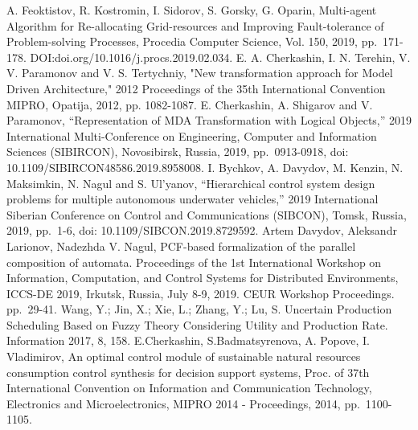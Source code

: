 \documentclass[runningheads]{llncs}
\begin{document}
\begin{thebibliography}{999}
    \makeatletter
    \def\@biblabel#1{[#1]}
    \makeatother
     A. Feoktistov, R. Kostromin, I. Sidorov, S. Gorsky, G. Oparin, Multi-agent Algorithm for Re-allocating Grid-resources and Improving Fault-tolerance of Problem-solving Processes, Procedia Computer Science, Vol. 150, 2019, pp. 171-178. DOI:doi.org/10.1016/j.procs.2019.02.034.
     E. A. Cherkashin, I. N. Terehin, V. V. Paramonov and V. S. Tertychniy, "New transformation approach for Model Driven Architecture," 2012 Proceedings of the 35th International Convention MIPRO, Opatija, 2012, pp. 1082-1087.
     E. Cherkashin, A. Shigarov and V. Paramonov, “Representation of MDA Transformation with Logical Objects,” 2019 International Multi-Conference on Engineering, Computer and Information Sciences (SIBIRCON), Novosibirsk, Russia, 2019, pp. 0913-0918, doi: 10.1109/SIBIRCON48586.2019.8958008.
     I. Bychkov, A. Davydov, M. Kenzin, N. Maksimkin, N. Nagul and S. Ul’yanov, “Hierarchical control system design problems for multiple autonomous underwater vehicles,” 2019 International Siberian Conference on Control and Communications (SIBCON), Tomsk, Russia, 2019, pp. 1-6, doi: 10.1109/SIBCON.2019.8729592.
     Artem Davydov, Aleksandr Larionov, Nadezhda V. Nagul, PCF-based formalization of the parallel composition of automata. Proceedings of the 1st International Workshop on Information, Computation, and Control Systems for Distributed Environments, ICCS-DE 2019, Irkutsk, Russia, July 8-9, 2019. CEUR Workshop Proceedings. pp. 29-41.
     Wang, Y.; Jin, X.; Xie, L.; Zhang, Y.; Lu, S. Uncertain Production Scheduling Based on Fuzzy Theory Considering Utility and Production Rate. Information 2017, 8, 158.
     E.Cherkashin, S.Badmatsyrenova, A. Popove, I. Vladimirov, An optimal control module of sustainable natural resources consumption control synthesis for decision support systems, Proc. of 37th International Convention on Information and Communication Technology, Electronics and Microelectronics, MIPRO 2014 - Proceedings, 2014, pp. 1100-1105.


\end{thebibliography}
\end{document}
